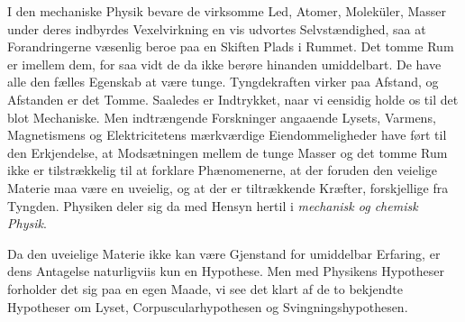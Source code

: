 \documentclass[12pt]{book}
\newcommand{\apage}[1]{\marginnote{\footnotesize\textit{[#1]}}}
\begin{document}
I den mechaniske Physik bevare de virksomme Led, Atomer, Moleküler, Masser
under deres indbyrdes Vexelvirkning en vis udvortes Selvstændighed, saa at
Forandringerne væsenlig beroe paa en Skiften Plads i Rummet. Det tomme Rum
er imellem dem, for saa vidt de da ikke berøre hinanden umiddelbart. De
have alle den fælles Egenskab at være tunge. Tyngdekraften virker paa
Afstand, og Afstanden er det Tomme. Saaledes er Indtrykket, naar vi
eensidig holde os til det blot Mechaniske. Men indtrængende Forskninger
angaaende Lysets, Varmens, Magnetismens og Elektricitetens mærkværdige
Eiendommeligheder have ført til den Erkjendelse, at Modsætningen mellem de
tunge Masser og det tomme Rum ikke er tilstrækkelig til at forklare
Phænomenerne, at der foruden den veielige Materie maa være en uveielig, og
at der er tiltrækkende Kræfter, forskjellige fra Tyngden.  \apage{139} Physiken deler
sig da med Hensyn hertil i \emph{mechanisk og chemisk Physik}.

Da den uveielige Materie ikke kan være Gjenstand for umiddelbar Erfaring,
er dens Antagelse naturligviis kun en Hypothese. Men med Physikens
Hypotheser forholder det sig paa en egen Maade, vi see det klart af de to
bekjendte Hypotheser om Lyset, Corpuscularhypothesen og Svingningshypothesen.
\end{document}
